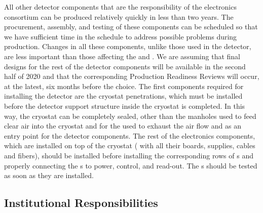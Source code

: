All other detector components that are the responsibility of the
 electronics consortium can be produced relatively quickly
in less than two years. The procurement, assembly, and
testing of these components can be scheduled so that
we have sufficient time in the schedule to address possible 
problems during production. Changes in all these
components, unlike those used in the  detector,
are less important than those affecting the 
and . We are assuming that final
designs for the rest of the detector components will be 
available in the second half of 2020 and that the corresponding 
Production Readiness Reviews will occur, at the latest, six months 
before the  choice.
The first components 
required for installing the detector are the cryostat 
penetrations, which must be installed before the 
detector support structure inside the cryostat is completed.
In this way, the cryostat can be completely sealed, other than
the manholes used to feed clear air into the cryostat
and for the  used to exhaust the air flow
and as an entry point for the detector components. The rest of the
 electronics components, which are installed on top of the 
cryostat ( with all their boards, supplies, cables
and fibers), should be installed before installing
the corresponding rows of s and properly connecting 
the s to power, control, and read-out. 
The s should be tested as soon as they are installed. 

\subsection{Institutional Responsibilities}
\label{sec:fdsp-tpcelec-management-resp}

